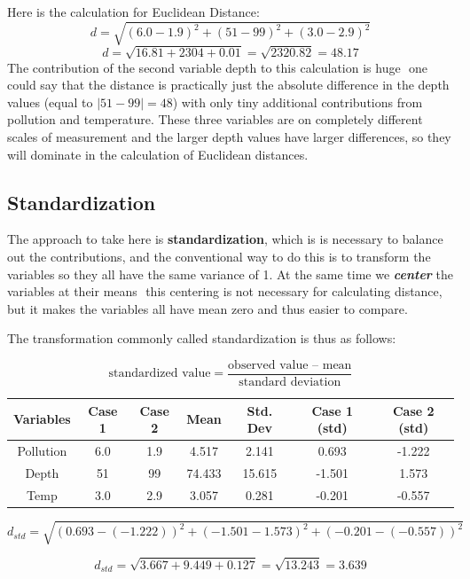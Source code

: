 \documentclass[a4paper,12pt]{article}
\begin{document}
Here is the calculation for Euclidean Distance:
\[ d = \sqrt{(6.0 - 1.9)^2 + (51 - 99)^2 + (3.0 - 2.9)^2}   \]
 \[ d = \sqrt{16.81 + 2304 + 0.01} = \sqrt{2320.82} = 48.17 \]
\noindent The contribution of the second variable depth to this calculation is huge  one could say
that the distance is practically just the absolute difference in the depth values (equal to
$|51-99| = 48$) with only tiny additional contributions from pollution and temperature. These three variables are on
completely different scales of measurement and the larger depth values have larger differences, so they will dominate in the calculation of Euclidean distances.

\subsection*{Standardization}
\noindent The approach to take here is \textbf{standardization}, which is is necessary to balance out the contributions, and the
conventional way to do this is to transform the variables so they all have the same variance
of 1. At the same time we \textbf{\textit{center}} the variables at their means  this centering is not
necessary for calculating distance, but it makes the variables all have mean zero and thus
easier to compare. 

\noindent The transformation commonly called standardization is thus as follows:

\[\mbox{standardized value} = \frac{\mbox{observed value  mean}}{ \mbox{standard deviation}}\]
\begin{center}
\begin{tabular}{|c|c|c|c|c|c|c|}
  \hline
Variables & Case 1 & Case 2 & Mean & Std. Dev & Case 1 (std) & Case 2 (std) \\ \hline
Pollution & 6.0 & 1.9 & 4.517	&	2.141	&	0.693	&	-1.222	\\
Depth & 51 & 99 & 74.433	&	15.615	&	-1.501	&	1.573	\\
Temp & 3.0 & 2.9 & 3.057	&	0.281	&	-0.201	&	-0.557	\\
  \hline
\end{tabular}
\end{center}

\[ d_{std} =  \sqrt{(0.693 - (- 1.222))^2 + (-1.501-1.573)^2 + (-0.201-(-0.557))^2} \]

\[ d_{std} = \sqrt{3.667 + 9.449 + 0.127} = \sqrt{13.243} = 3.639 \]
\end{document}
